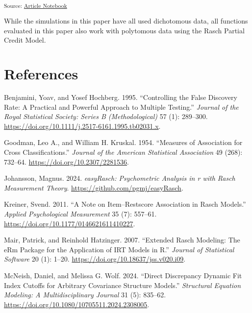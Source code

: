 \documentclass[
  letterpaper,
  DIV=11,
  numbers=noendperiod]{scrartcl}
\newlength{\cslhangindent}
\newenvironment{CSLReferences}[2] %
 {\begin{list}{}{%
  \setlength{\itemindent}{0pt}
  \setlength{\leftmargin}{0pt}
  \setlength{\parsep}{0pt}
  \ifodd #1
   \setlength{\leftmargin}{\cslhangindent}
   \setlength{\itemindent}{-1\cslhangindent}
  \fi
  \setlength{\itemsep}{#2\baselineskip}}}
 {\end{list}}
\begin{document}
\textsubscript{Source:
\href{https://pgmj.github.io/rasch_itemfit/index.qmd.html}{Article
Notebook}}

While the simulations in this paper have all used dichotomous data, all
functions evaluated in this paper also work with polytomous data using
the Rasch Partial Credit Model.

\section*{References}\label{references}

\label{refs}
\begin{CSLReferences}{1}{0}
Benjamini, Yoav, and Yosef Hochberg. 1995. {``Controlling the {False}
{Discovery} {Rate}: {A} {Practical} and {Powerful} {Approach} to
{Multiple} {Testing}.''} \emph{Journal of the Royal Statistical Society:
Series B (Methodological)} 57 (1): 289--300.
\url{https://doi.org/10.1111/j.2517-6161.1995.tb02031.x}.

Goodman, Leo A., and William H. Kruskal. 1954. {``Measures of
{Association} for {Cross} {Classifications}.''} \emph{Journal of the
American Statistical Association} 49 (268): 732--64.
\url{https://doi.org/10.2307/2281536}.

Johansson, Magnus. 2024. \emph{easyRasch: Psychometric Analysis in r
with Rasch Measurement Theory}. \url{https://github.com/pgmj/easyRasch}.

Kreiner, Svend. 2011. {``A {Note} on {Item}--{Restscore} {Association}
in {Rasch} {Models}.''} \emph{Applied Psychological Measurement} 35 (7):
557--61. \url{https://doi.org/10.1177/0146621611410227}.

Mair, Patrick, and Reinhold Hatzinger. 2007. {``Extended {Rasch}
{Modeling}: {The} {eRm} {Package} for the {Application} of {IRT}
{Models} in {R}.''} \emph{Journal of Statistical Software} 20 (1):
1--20. \url{https://doi.org/10.18637/jss.v020.i09}.

McNeish, Daniel, and Melissa G. Wolf. 2024. {``Direct {Discrepancy}
{Dynamic} {Fit} {Index} {Cutoffs} for {Arbitrary} {Covariance}
{Structure} {Models}.''} \emph{Structural Equation Modeling: A
Multidisciplinary Journal} 31 (5): 835--62.
\url{https://doi.org/10.1080/10705511.2024.2308005}.


\end{CSLReferences}
\end{document}
